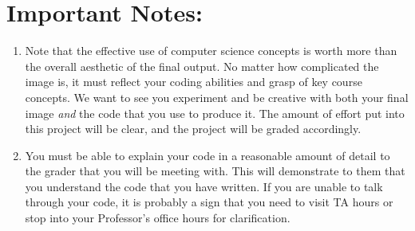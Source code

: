\documentclass[11pt, letterpaper, onecolumn, oneside, final]{article}
\begin{document}
    \section{Important Notes:} 
    \begin{enumerate}
        \item Note that the effective use of computer science concepts is worth more than the overall aesthetic of the final output. No matter how complicated the image is, it must reflect your coding abilities and grasp of key course concepts. We want to see you experiment and be creative with both your final image \emph{and} the code that you use to produce it. The amount of effort put into this project will be clear, and the project will be graded accordingly.
        \item You must be able to explain your code in a reasonable amount of detail to the grader that you will be meeting with. This will demonstrate to them that you understand the code that you have written. If you are unable to talk through your code, it is probably a sign that you need to visit TA hours or stop into your Professor's office hours for clarification. 
    \end{enumerate}
\end{document}
